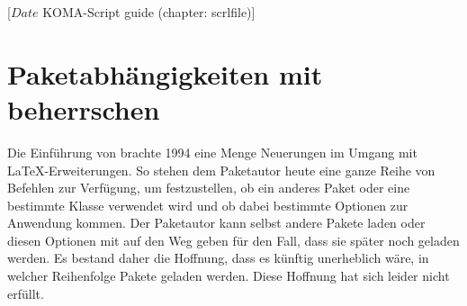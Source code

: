 %
%
%
%
%
%
%
%
% 
%
%
%
%

%
                 [$Date$
                  KOMA-Script guide (chapter: scrlfile)]

\chapter{Paketabhängigkeiten mit  
  beherrschen}

\BeginIndexGroup
{}

Die Einführung von \LaTeXe{} brachte 1994 eine Menge Neuerungen im Umgang mit
\LaTeX-Erweiterungen. So stehen dem Paketautor heute eine ganze Reihe von
Befehlen zur Verfügung, um festzustellen, ob ein anderes Paket oder eine
bestimmte Klasse verwendet wird und ob dabei bestimmte Optionen zur Anwendung
kommen. Der Paketautor kann selbst andere Pakete laden oder diesen Optionen
mit auf den Weg geben für den Fall, dass sie später noch geladen werden. Es
bestand daher die Hoffnung, dass es künftig unerheblich wäre, in welcher
Reihenfolge Pakete geladen werden. Diese Hoffnung hat sich leider nicht
erfüllt.


